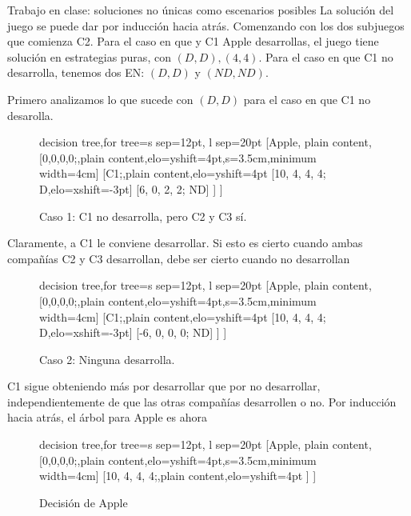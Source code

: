 \documentclass[12pt]{scrartcl}
\begin{document}
\begin{exbox}{Trabajo en clase: soluciones no únicas como escenarios posibles}
La solución del juego se puede dar por inducción hacia atrás. Comenzando con los dos subjuegos que comienza C2. Para el caso en que y C1 Apple desarrollas, el juego tiene solución en estrategias puras, con ${(D,D), (4,4)}$. Para el caso en que C1 no desarrolla, tenemos dos EN: $(D,D)$ y $(ND,ND)$. 

Primero analizamos lo que sucede con  $(D,D)$ para el caso en que C1 no desarolla. 

\begin{figure}[H]
	\centering
	\footnotesize{
		\begin{forest} decision tree,for tree={s sep=12pt, l sep=20pt}
			[Apple, plain content,
				[{0,0,0,0};,plain content,elo={yshift=4pt},s=3.5cm,minimum width=4cm]
				[C1;,plain content,elo={yshift=4pt}
					[{10, 4, 4, 4}; {D},elo={xshift=-3pt}]
					[{6, 0, 2, 2}; {ND}]
				]
			]
		\end{forest}%
		}
		\caption{Caso 1: C1 no desarrolla, pero C2 y C3 sí.}
	\label{fig:apple_ilose}
\end{figure}

Claramente, a C1 le conviene desarrollar. Si esto es cierto cuando ambas compañías C2 y C3 desarrollan, debe ser cierto cuando no desarrollan

\begin{figure}[H]
	\centering
	\footnotesize{
		\begin{forest} decision tree,for tree={s sep=12pt, l sep=20pt}
			[Apple, plain content,
				[{0,0,0,0};,plain content,elo={yshift=4pt},s=3.5cm,minimum width=4cm]
				[C1;,plain content,elo={yshift=4pt}
					[{10, 4, 4, 4}; {D},elo={xshift=-3pt}]
					[{-6, 0, 0, 0}; {ND}]
				]
			]
		\end{forest}%
		}
		\caption{Caso 2: Ninguna desarrolla.}
	\label{fig:apple_ilose2}
\end{figure}

C1 sigue obteniendo más por desarrollar que por no desarrollar, independientemente de que las otras compañías desarrollen o no. Por inducción hacia atrás, el árbol para Apple es ahora

\begin{figure}[H]
	\centering
	\footnotesize{
		\begin{forest} decision tree,for tree={s sep=12pt, l sep=20pt}
			[Apple, plain content,
				[{0,0,0,0};,plain content,elo={yshift=4pt},s=3.5cm,minimum width=4cm]
				[{10, 4, 4, 4};,plain content,elo={yshift=4pt}				]
			]
		\end{forest}%
		}
		\caption{Decisión de Apple}
	\label{fig:apple_ilose3}
\end{figure}


\end{exbox}
\end{document}
